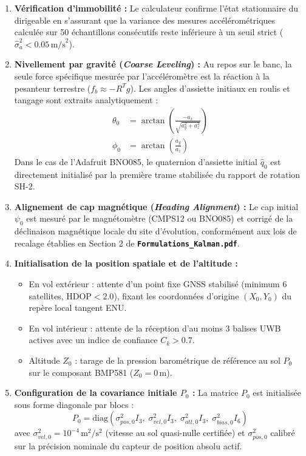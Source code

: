 \documentclass[../Implementation.tex]{subfiles}
\begin{document}
\begin{enumerate}
    \item \textbf{Vérification d'immobilité :} 
    Le calculateur confirme l'état stationnaire du dirigeable en s'assurant que la variance des mesures accélérométriques calculée sur 50 échantillons consécutifs reste inférieure à un seuil strict ($\hat{\sigma}_a^2 < 0.05\,\text{m/s}^2$).
    
    \item \textbf{Nivellement par gravité (\textit{Coarse Leveling}) :} 
    Au repos sur le banc, la seule force spécifique mesurée par l'accéléromètre est la réaction à la pesanteur terrestre ($f_b \approx -R^T g$). Les angles d'assiette initiaux en roulis et tangage sont extraits analytiquement :
    \begin{align}
        \theta_0 &= \arctan\left(\frac{-a_x}{\sqrt{a_y^2 + a_z^2}}\right) \\
        \phi_0 &= \arctan\left(\frac{a_y}{a_z}\right)
    \end{align}
    Dans le cas de l'Adafruit BNO085, le quaternion d'assiette initial $\hat{q}_0$ est directement initialisé par la première trame stabilisée du rapport de rotation SH-2.

    \item \textbf{Alignement de cap magnétique (\textit{Heading Alignment}) :} 
    Le cap initial $\psi_0$ est mesuré par le magnétomètre (CMPS12 ou BNO085) et corrigé de la déclinaison magnétique locale du site d'évolution, conformément aux lois de recalage établies en Section 2 de \textbf{\texttt{Formulations\_Kalman.pdf}}.

    \item \textbf{Initialisation de la position spatiale et de l'altitude :} 
    \begin{itemize}
        \item En vol extérieur : attente d'un point fixe GNSS stabilisé (minimum 6 satellites, $\text{HDOP} < 2.0$), fixant les coordonnées d'origine $(X_0, Y_0)$ du repère local tangent ENU.
        \item En vol intérieur : attente de la réception d'au moins 3 balises UWB actives avec un indice de confiance $C_k > 0.7$.
        \item Altitude $Z_0$ : tarage de la pression barométrique de référence au sol $P_0$ sur le composant BMP581 ($Z_0 = 0\,\text{m}$).
    \end{itemize}

    \item \textbf{Configuration de la covariance initiale $P_0$ :} 
    La matrice $P_0$ est initialisée sous forme diagonale par blocs :
    \begin{equation}
        P_0 = \text{diag}\left(\sigma_{pos, 0}^2 I_3, \; \sigma_{vel, 0}^2 I_3, \; \sigma_{att, 0}^2 I_3, \; \sigma_{bias, 0}^2 I_6\right)
    \end{equation}
    avec $\sigma_{vel, 0}^2 = 10^{-4}\,\text{m}^2/\text{s}^2$ (vitesse au sol quasi-nulle certifiée) et $\sigma_{pos, 0}^2$ calibré sur la précision nominale du capteur de position absolu actif.
\end{enumerate}
\end{document}
